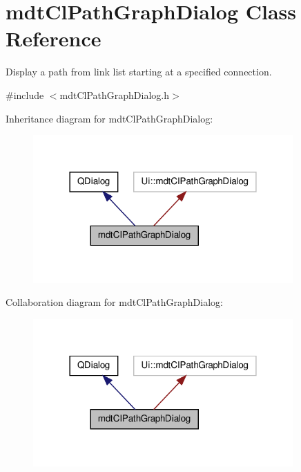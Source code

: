 \hypertarget{classmdt_cl_path_graph_dialog}{\section{mdt\-Cl\-Path\-Graph\-Dialog Class Reference}
\label{classmdt_cl_path_graph_dialog}
}


Display a path from link list starting at a specified connection.  




{\ttfamily \#include $<$mdt\-Cl\-Path\-Graph\-Dialog.\-h$>$}



Inheritance diagram for mdt\-Cl\-Path\-Graph\-Dialog\-:
\nopagebreak
\begin{figure}[H]
\begin{center}
\leavevmode
\includegraphics[width=282pt]{classmdt_cl_path_graph_dialog__inherit__graph}
\end{center}
\end{figure}


Collaboration diagram for mdt\-Cl\-Path\-Graph\-Dialog\-:
\nopagebreak
\begin{figure}[H]
\begin{center}
\leavevmode
\includegraphics[width=282pt]{classmdt_cl_path_graph_dialog__coll__graph}
\end{center}
\end{figure}
